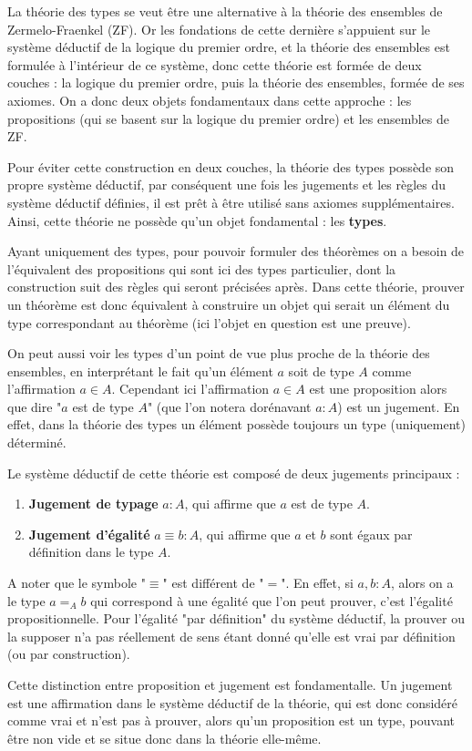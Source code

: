 \documentclass[../../rapport.tex]{subfiles}
\begin{document}
  La théorie des types se veut être une alternative à la théorie des ensembles de Zermelo-Fraenkel (ZF).
  Or les fondations de cette dernière s'appuient sur le système déductif de la logique du premier ordre,
  et la théorie des ensembles est formulée à l'intérieur de ce système, donc cette théorie est formée
  de deux couches : la logique du premier ordre, puis la théorie des ensembles, formée de ses axiomes.
  On a donc deux objets fondamentaux dans cette approche :
  les propositions (qui se basent sur la logique du premier ordre) et les ensembles de ZF.

  Pour éviter cette construction en deux couches, la théorie des types possède son propre système déductif,
  par conséquent une fois les jugements et les règles du système déductif définies,
  il est prêt à être utilisé sans axiomes supplémentaires.
  Ainsi, cette théorie ne possède qu'un objet fondamental : les \textbf{types}.

  Ayant uniquement des types, pour pouvoir formuler des théorèmes on a besoin de l'équivalent des propositions
  qui sont ici des types particulier, dont la construction suit des règles qui seront précisées après.
  Dans cette théorie, prouver un théorème est donc équivalent à construire un objet
  qui serait un élément du type correspondant au théorème (ici l'objet en question est une preuve).

  On peut aussi voir les types d'un point de vue plus proche de la théorie des ensembles,
  en interprétant le fait qu'un élément $a$ soit de type $A$ comme l'affirmation $a \in A$.
  Cependant ici l'affirmation $a \in A$ est une proposition alors que dire "$a$ est de type $A$"
  (que l'on notera dorénavant $a : A$) est un jugement. En effet,
  dans la théorie des types un élément possède toujours un type (uniquement) déterminé.

  Le système déductif de cette théorie est composé de deux jugements principaux :
  \begin{enumerate}
    \item \textbf{Jugement de typage} $a : A$, qui affirme que $a$ est de type $A$.
    \item \textbf{Jugement d'égalité} $a \equiv b : A$, qui affirme que $a$ et $b$ sont égaux par définition dans le type $A$.
  \end{enumerate}
  A noter que le symbole "$\equiv$" est différent de "$=$".
  En effet, si $a, b : A$, alors on a le type $a =_A b$ qui correspond à une égalité
  que l'on peut prouver, c'est l'égalité propositionnelle.
  Pour l'égalité "par définition" du système déductif, la prouver ou la supposer n'a pas réellement de sens
  étant donné qu'elle est vrai par définition (ou par construction).

  Cette distinction entre proposition et jugement est fondamentalle.
  Un jugement est une affirmation dans le système déductif de la théorie, qui est donc considéré comme vrai et n'est pas à prouver,
  alors qu'un proposition est un type, pouvant être non vide et se situe donc dans la théorie elle-même.
\end{document}
